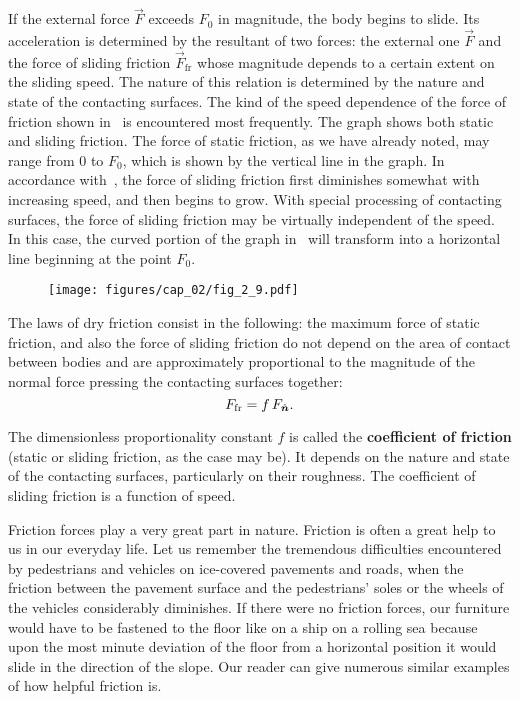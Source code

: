 If the external force $\vec{F}$ exceeds $F_0$ in magnitude, the body begins to slide. Its acceleration is determined by the resultant of two forces: the external one $\vec{F}$ and the force of sliding friction $\vec{F}_{\text{fr}}$ whose magnitude depends to a certain extent on the sliding speed. The nature of this relation is determined by the nature and state of the contacting surfaces. The kind of the speed dependence of the force of friction shown in~ is encountered most frequently. The graph shows both static and sliding friction. The force of static friction, as we have already noted, may range from $0$ to $F_0$, which is shown by the vertical line in the graph. In accordance with~, the force of sliding friction first diminishes somewhat with increasing speed, and then begins to grow. With special processing of contacting surfaces, the force of sliding friction may be virtually independent of the speed. In this case, the curved portion of the graph in~ will transform into a horizontal line beginning at the point $F_0$.

\begin{figure}[t]
	\begin{center}
		\texttt{[image: figures/cap\_02/fig\_2\_9.pdf]}
		\caption[]{}
		\label{fig:2_9}
	\end{center}
	\vspace{-0.7cm}
\end{figure}

The laws of dry friction consist in the following: the maximum force of static friction, and also the force of sliding friction do not depend on the area of contact between bodies and are approximately proportional to the magnitude of the normal force pressing the contacting surfaces together:
\begin{equation}\label{eq:2_35}
F_{\text{fr}} = f\,F_{\hat{\boldsymbol{n}}}.
\end{equation}

\noindent
The dimensionless proportionality constant $f$ is called the \textbf{coefficient of friction} (static or sliding friction, as the case may be). It depends on the nature and state of the contacting surfaces, particularly on their roughness. The coefficient of sliding friction is a function of speed.

Friction forces play a very great part in nature. Friction is often a great help to us in our everyday life. Let us remember the tremendous difficulties encountered by pedestrians and vehicles on ice-covered pavements and roads, when the friction between the pavement surface and the pedestrians' soles or the wheels of the vehicles considerably diminishes. If there were no friction forces, our furniture would have to be fastened to the floor like on a ship on a rolling sea because upon the most minute deviation of the floor from a horizontal position it would slide in the direction of the slope. Our reader can give numerous similar examples of how helpful friction is.

